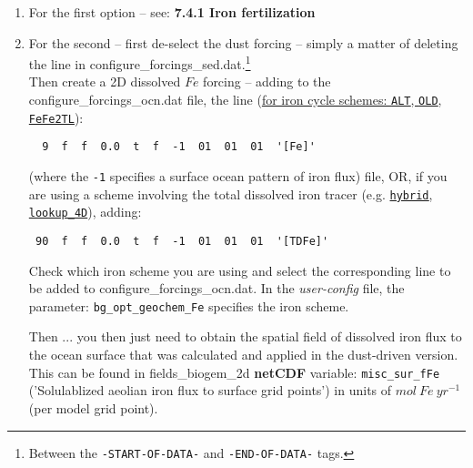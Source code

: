 \documentclass[11pt,fleqn]{book} %
\begin{document}
\begin{enumerate}[noitemsep]
\vspace{1mm}
\item For the first option -- see: \textbf{7.4.1 Iron fertilization}
\vspace{1mm}
\item For the second -- first de-select the dust forcing -- simply a matter of  deleting the line in \textsf{\footnotesize configure\_forcings\_sed.dat}.\footnote{Between the \texttt{-START-OF-DATA-} and \texttt{-END-OF-DATA-} tags.}
\\ Then create a 2D dissolved \(Fe\) forcing -- adding to the \textsf{\footnotesize configure\_forcings\_ocn.dat} file, the line (\uline{for iron cycle schemes: \texttt{ALT}, \texttt{OLD}, \texttt{FeFe2TL}}): 
\vspace{-1mm}\begin{verbatim}
  9  f  f  0.0  t  f  -1  01  01  01  '[Fe]'
\end{verbatim}\vspace{-1mm}
\noindent (where the \texttt{-1} specifies a surface ocean pattern of iron flux) file, OR, if you are using a scheme involving the total dissolved iron tracer (e.g. \uline{\texttt{hybrid}, \texttt{lookup\_4D}}), adding:
\vspace{-1mm}\begin{verbatim}
 90  f  f  0.0  t  f  -1  01  01  01  '[TDFe]'
\end{verbatim}\vspace{-1mm}
Check which iron scheme you are using and select the corresponding line to be added to \textsf{\footnotesize configure\_forcings\_ocn.dat}. In the \textit{user-config} file, the parameter: \texttt{bg\_opt\_geochem\_Fe} specifies the iron scheme.

Then ... you then just need to obtain the spatial field of dissolved iron flux to the ocean surface that was calculated and applied in the dust-driven version. This can be found in \textsf{\footnotesize fields\_biogem\_2d} \textbf{netCDF} variable: \texttt{misc\_sur\_fFe} ('Solulablized aeolian iron flux to surface grid points') in units of \(mol \:Fe \:yr^{-1}\) (per model grid point). 


\end{enumerate}
\end{document}
